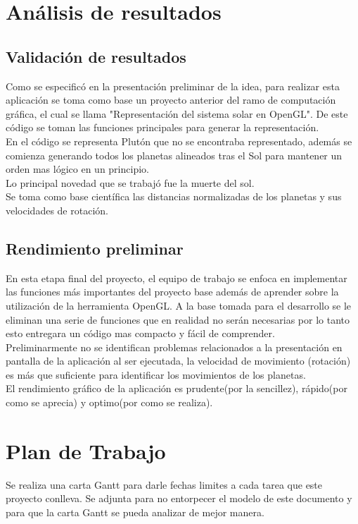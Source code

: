 \documentclass[12pt,journal,compsoc]{IEEEtran}
\begin{document}
\section{Análisis de resultados}
\subsection{Validación de resultados}
Como se especificó en  la presentación preliminar de la idea, para realizar esta aplicación se toma como base un proyecto anterior del ramo de computación gráfica, el cual se llama "Representación del sistema solar en OpenGL". De este código se toman las funciones principales para generar la representación.\\
En el código se representa Plutón que no se encontraba representado, además se comienza generando todos los planetas alineados tras el Sol para mantener un orden mas lógico en un principio.\\
Lo principal novedad que se trabajó fue la muerte del sol.\\
Se toma como base científica las distancias normalizadas de los planetas y sus velocidades de rotación.
\subsection{Rendimiento preliminar}
En esta etapa final del proyecto, el equipo de trabajo se enfoca en implementar las funciones más importantes del proyecto base además de aprender sobre la utilización de la herramienta OpenGL. A la base tomada para el desarrollo se le eliminan una serie de funciones que en realidad no serán necesarias por lo tanto esto entregara un código mas compacto y fácil de comprender.\\
Preliminarmente no se identifican problemas relacionados a la presentación en pantalla de la aplicación al ser ejecutada, la velocidad de movimiento (rotación) es más que suficiente para identificar los movimientos de los planetas.\\
El rendimiento gráfico de la aplicación es prudente(por la sencillez), rápido(por como se aprecia) y optimo(por como se realiza).
\section{Plan de Trabajo}
Se realiza una carta Gantt para darle fechas limites a cada tarea que este proyecto conlleva. Se adjunta para no entorpecer el modelo de este documento y para que la carta Gantt se pueda analizar de mejor manera.
%
\end{document}
